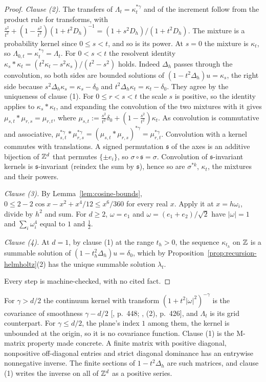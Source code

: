\begin{proof}
\emph{Clause (2).} The transfers of $\Lambda_t = \kappa_t^{*\gamma}$ and of the increment follow
from the product rule for transforms, with $\tfrac{s^2}{t^2} + (1 - \tfrac{s^2}{t^2})(1 +
t^2D_h)^{-1} = (1 + s^2D_h)/(1 + t^2D_h)$. The mixture is a probability kernel since $0 \le s < t$,
and so is its power. At $s = 0$ the mixture is $\kappa_t$, so $\Lambda_{0,t} = \kappa_t^{*\gamma} =
\Lambda_t$. For $0 < s < t$ the resolvent identity
$\kappa_s * \kappa_t = (t^2\kappa_t - s^2\kappa_s)/(t^2 - s^2)$ holds. Indeed $\Delta_h$ passes
through the convolution, so both sides are bounded solutions of $(1 - t^2\Delta_h)u = \kappa_s$, the
right side because $s^2\Delta_h\kappa_s = \kappa_s - \delta_0$ and $t^2\Delta_h\kappa_t = \kappa_t -
\delta_0$. They agree by the uniqueness of clause (1). For $0 \le r < s < t$ the scale $s$ is
positive, so the identity applies to $\kappa_s * \kappa_t$, and expanding the convolution of the two
mixtures with it gives $\mu_{s,t} * \mu_{r,s} = \mu_{r,t}$, where
$\mu_{s,t} := \tfrac{s^2}{t^2}\delta_0 + (1 - \tfrac{s^2}{t^2})\kappa_t$. As convolution is
commutative and associative, $\mu_{s,t}^{*\gamma} * \mu_{r,s}^{*\gamma} = (\mu_{s,t} *
\mu_{r,s})^{*\gamma} = \mu_{r,t}^{*\gamma}$. Convolution with a kernel commutes with translations.
A signed permutation $\mathfrak{s}$ of the axes is an additive bijection of $\mathbb{Z}^d$ that permutes
$\{\pm e_i\}$, so $\sigma\circ\mathfrak{s} = \sigma$. Convolution of $\mathfrak{s}$-invariant kernels
is $\mathfrak{s}$-invariant (reindex the sum by $\mathfrak{s}$), hence so are $\sigma^{*k}$,
$\kappa_t$, the mixtures and their powers.

\emph{Clause (3).} By Lemma~\ref{lem:cosine-bounds},
$0 \le 2 - 2\cos x - x^2 + x^4/12 \le x^6/360$ for every real $x$. Apply it at $x = h\omega_i$, divide
by $h^2$ and sum. For $d \ge 2$, $\omega = e_1$ and $\omega = (e_1 + e_2)/\sqrt2$ have $|\omega| = 1$
and $\sum_i\omega_i^4$ equal to $1$ and $\tfrac12$.

\emph{Clause (4).} At $d = 1$, by clause (1) at the range $t_h > 0$, the sequence $\kappa_{t_h}$ on
$\mathbb{Z}$ is a summable solution of $(1 - t_h^2\Delta_h)u = \delta_0$, which by
Proposition~\ref{prop:recursion-helmholtz}(2) has the unique summable solution $\lambda_t$.

Every step is machine-checked, with no cited fact.
\end{proof}

For $\gamma > d/2$ the continuum kernel with transform $(1 + t^2|\omega|^2)^{-\gamma}$ is the
\Matern{} covariance of smoothness $\gamma - d/2$ [, p.~448;
, (2), p.~426], and $\Lambda_t$ is its grid counterpart. For $\gamma \le d/2$,
the plane's index $1$ among them, the kernel is unbounded at the origin, so it is no covariance
function. Clause (1) is the M-matrix property made concrete. A finite matrix with positive
diagonal, nonpositive off-diagonal entries and strict diagonal dominance has an entrywise
nonnegative inverse. The finite sections of $1 - t^2\Delta_h$ are such matrices, and clause (1)
writes the inverse on all of $\mathbb{Z}^d$ as a positive series.

